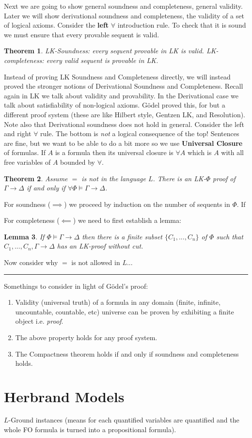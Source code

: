 \documentclass[twoside]{article}
\newcounter{lecnum}
\newtheorem{theorem}{Theorem}[lecnum]
\newtheorem{lemma}[theorem]{Lemma}
\newenvironment{proof}{{\bf Proof:}}{\hfill\rule{2mm}{2mm}}
\begin{document}
Next we are going to show general soundness and completeness, general validity. Later we will show derivational soundness and completeness, the validity of a set of logical axioms. Consider the \textbf{left} $\forall$ introduction rule. To check that it is sound we must ensure that every provable sequent is valid. 

\begin{theorem}
LK-Soundness: every sequent provable in LK is valid. LK-completeness: every valid sequent is provable in LK.
\end{theorem}

Instead of proving LK Soundness and Completeness directly, we will instead proved the stronger notions of Derivational Soundness and Completeness. Recall again in LK we talk about validity and provability. In the Derivational case we talk about satisfiability of non-logical axioms. G\"{o}del proved this, for but a different proof system (these are like Hilbert style, Gentzen LK, and Resolution). Note also that Derivational soundness does not hold in general. Consider the left and right $\forall$ rule. The bottom is \emph{not} a logical consequence of the top! Sentences are fine, but we want to be able to do a bit more so we use \textbf{Universal Closure} of formulas. If $A$ is a formula then its universal closure is $\forall A$ which is $A$ with all free variables of $A$ bounded by $\forall$. 

\begin{theorem}
Assume $=$ is not in the language $L$. There is an LK-$\Phi$ proof of $\Gamma\rightarrow\Delta$ if and only if $\forall \Phi \vDash \Gamma \rightarrow \Delta$. 
\end{theorem}   
\begin{proof}
For soundness ($\implies$) we proceed by induction on the number of sequents in $\Phi$. If 

For completeness ($\impliedby$) we need to first establish a lemma:
\begin{lemma}
If $\Phi \vDash \Gamma \rightarrow \Delta$ then there is a finite subset $\{C_1, ..., C_n\}$ of $\Phi$ such that $C_1, ..., C_n, \Gamma \rightarrow \Delta$ has an LK-proof without cut. 
\end{lemma}

Now consider why $=$ is not allowed in $L$... 
\end{proof}

Somethings to consider in light of G\"{o}del's proof:
\begin{enumerate}
\item Validity (universal truth) of a formula in any domain (finite, infinite, uncountable, countable, etc) universe can be proven by exhibiting a finite object i.e. \emph{proof}.
\item The above property holds for any proof system.
\item The Compactness theorem holds if and only if soundness and completeness holds. 
\end{enumerate}

\section{Herbrand Models}
$L$-Ground instances (means for each quantified variables are quantified and the whole FO formula is turned into a propositional formula).
\end{document}
